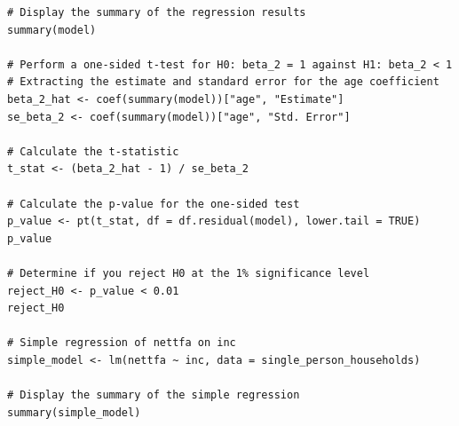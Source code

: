 \documentclass[12pt]{article}
\begin{document}
\begin{enumerate}
{\begin{verbatim}
# Display the summary of the regression results
summary(model)

# Perform a one-sided t-test for H0: beta_2 = 1 against H1: beta_2 < 1
# Extracting the estimate and standard error for the age coefficient
beta_2_hat <- coef(summary(model))["age", "Estimate"]
se_beta_2 <- coef(summary(model))["age", "Std. Error"]

# Calculate the t-statistic
t_stat <- (beta_2_hat - 1) / se_beta_2

# Calculate the p-value for the one-sided test
p_value <- pt(t_stat, df = df.residual(model), lower.tail = TRUE)
p_value

# Determine if you reject H0 at the 1% significance level
reject_H0 <- p_value < 0.01
reject_H0

# Simple regression of nettfa on inc
simple_model <- lm(nettfa ~ inc, data = single_person_households)

# Display the summary of the simple regression
summary(simple_model)
\end{verbatim}

}




\end{enumerate}
\end{document}
